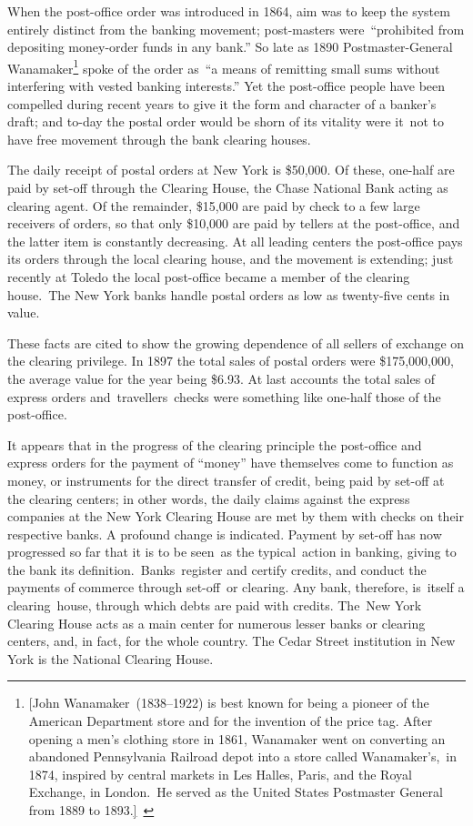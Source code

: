 \documentclass[openany,nobib]{tufte-book}
\begin{document}
When the post-office order was introduced in 1864, aim was to keep the
system entirely distinct from the banking movement; post-masters
were~``prohibited from depositing money-order funds in any bank.'' So
late as 1890 Postmaster-General Wanamaker\footnote{{[}John
  Wanamaker~(1838--1922) is best known for being a pioneer of the
  American Department store and for the invention of the price tag.
  After opening a men's clothing store in 1861, Wanamaker went on
  converting an abandoned Pennsylvania Railroad depot into a store
  called Wanamaker's,~in 1874, inspired by central markets in Les
  Halles, Paris, and the Royal Exchange, in London.~He served as the
  United States Postmaster General from 1889 to
  1893.\href{applewebdata://D02306DF-3E46-4684-BD1A-1A323FFB2CB2\#_msocom_1}{{]}}~}
spoke of the order as~``a means of remitting small sums without
interfering with vested banking interests.'' Yet the post-office people
have been compelled during recent years to give it the form and
character of a banker's draft; and to-day the postal order would be
shorn of its vitality were it~not to have free movement through the bank
clearing houses. ~

The daily receipt of postal orders at New York is \$50,000. Of these,
one-half are paid by set-off through the Clearing House, the Chase
National Bank acting as clearing agent. Of the remainder, \$15,000 are
paid by check to a few large receivers of orders, so that only \$10,000
are paid by tellers at the post-office, and the latter item is
constantly decreasing. At all leading centers the post-office pays its
orders through the local clearing house, and the movement is extending;
just recently at Toledo the local post-office became a member of the
clearing house.~The New York banks handle postal orders as low as
twenty-five cents in value.~

These facts are cited to show the growing dependence of all sellers of
exchange on the clearing privilege. In 1897 the total sales of postal
orders were \$175,000,000, the average value for the year being \$6.93.
At last accounts the total sales of express orders and~travellers~checks
were something like one-half those of the post-office. ~

It appears that in the progress of the clearing principle the
post-office and express orders for the payment of ``money'' have
themselves come to function as money, or instruments for the direct
transfer of credit, being paid by set-off at the clearing centers; in
other words, the daily claims against the express companies at the New
York Clearing House are met by them with checks on their respective
banks. A profound change is indicated. Payment by set-off has now
progressed so far that it is to be seen~as the typical~action in
banking, giving to the bank its definition.~Banks~register and certify
credits, and conduct the payments of commerce through set-off~or
clearing. Any bank, therefore, is~itself a clearing~house, through which
debts are paid with credits. The~New York Clearing House acts as a main
center for numerous lesser banks or clearing centers, and, in fact, for
the whole country. The Cedar Street institution in New York is the
National Clearing House.~
\end{document}
